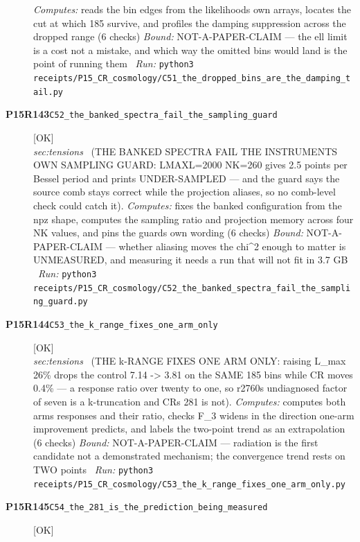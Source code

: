\begin{description}
\emph{Computes:} reads the bin edges from the likelihoods own arrays, locates the cut at which 185 survive, and profiles the damping suppression across the dropped range (6 checks)
 \emph{Bound:} NOT-A-PAPER-CLAIM --- the ell limit is a cost not a mistake, and which way the omitted bins would land is the point of running them
\ \emph{Run:} \texttt{python3 receipts/P15\_CR\_cosmology/C51\_the\_dropped\_bins\_are\_the\_damping\_tail.py}
\item[\rcptlabel{C52_the_banked_spectra_fail_the_sampling_guard}{P15R143}\textbf{P15R143}\quad\texttt{C52\_the\_banked\_spectra\_fail\_the\_sampling\_guard}]\hfill\textsf{[OK]}\\
\textit{sec:tensions} \ (THE BANKED SPECTRA FAIL THE INSTRUMENTS OWN SAMPLING GUARD: LMAXL=2000 NK=260 gives 2.5 points per Bessel period and prints UNDER-SAMPLED --- and the guard says the source comb stays correct while the projection aliases, so no comb-level check could catch it). 
\emph{Computes:} fixes the banked configuration from the npz shape, computes the sampling ratio and projection memory across four NK values, and pins the guards own wording (6 checks)
 \emph{Bound:} NOT-A-PAPER-CLAIM --- whether aliasing moves the chi\textasciicircum{}2 enough to matter is UNMEASURED, and measuring it needs a run that will not fit in 3.7 GB
\ \emph{Run:} \texttt{python3 receipts/P15\_CR\_cosmology/C52\_the\_banked\_spectra\_fail\_the\_sampling\_guard.py}
\item[\rcptlabel{C53_the_k_range_fixes_one_arm_only}{P15R144}\textbf{P15R144}\quad\texttt{C53\_the\_k\_range\_fixes\_one\_arm\_only}]\hfill\textsf{[OK]}\\
\textit{sec:tensions} \ (THE k-RANGE FIXES ONE ARM ONLY: raising L\_max 26\% drops the control 7.14 -> 3.81 on the SAME 185 bins while CR moves 0.4\% --- a response ratio over twenty to one, so r2760s undiagnosed factor of seven is a k-truncation and CRs 281 is not). 
\emph{Computes:} computes both arms responses and their ratio, checks F\_3 widens in the direction one-arm improvement predicts, and labels the two-point trend as an extrapolation (6 checks)
 \emph{Bound:} NOT-A-PAPER-CLAIM --- radiation is the first candidate not a demonstrated mechanism; the convergence trend rests on TWO points
\ \emph{Run:} \texttt{python3 receipts/P15\_CR\_cosmology/C53\_the\_k\_range\_fixes\_one\_arm\_only.py}
\item[\rcptlabel{C54_the_281_is_the_prediction_being_measured}{P15R145}\textbf{P15R145}\quad\texttt{C54\_the\_281\_is\_the\_prediction\_being\_measured}]\hfill\textsf{[OK]}\\

\end{description}
